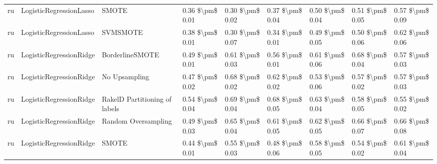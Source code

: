 \begin{tabular}{lllllllll}
      ru &         LogisticRegressionLasso &                         SMOTE &     0.36 \$\textbackslash pm\$ 0.01 &           0.30 \$\textbackslash pm\$ 0.02 &       0.37 \$\textbackslash pm\$ 0.04 &        0.50 \$\textbackslash pm\$ 0.04 &                         0.51 \$\textbackslash pm\$ 0.05 &     0.57 \$\textbackslash pm\$ 0.09 \\
      ru &         LogisticRegressionLasso &                      SVMSMOTE &     0.38 \$\textbackslash pm\$ 0.01 &           0.30 \$\textbackslash pm\$ 0.07 &       0.34 \$\textbackslash pm\$ 0.01 &        0.49 \$\textbackslash pm\$ 0.05 &                         0.50 \$\textbackslash pm\$ 0.06 &     0.62 \$\textbackslash pm\$ 0.06 \\
      ru &         LogisticRegressionRidge &               BorderlineSMOTE &     0.49 \$\textbackslash pm\$ 0.01 &           0.61 \$\textbackslash pm\$ 0.03 &       0.56 \$\textbackslash pm\$ 0.01 &        0.61 \$\textbackslash pm\$ 0.06 &                         0.68 \$\textbackslash pm\$ 0.04 &     0.57 \$\textbackslash pm\$ 0.03 \\
      ru &         LogisticRegressionRidge &                 No Upsampling &     0.47 \$\textbackslash pm\$ 0.02 &           0.68 \$\textbackslash pm\$ 0.02 &       0.62 \$\textbackslash pm\$ 0.02 &        0.53 \$\textbackslash pm\$ 0.06 &                         0.57 \$\textbackslash pm\$ 0.02 &     0.57 \$\textbackslash pm\$ 0.03 \\
      ru &         LogisticRegressionRidge & RakelD Partitioning of labels &     0.54 \$\textbackslash pm\$ 0.04 &           0.69 \$\textbackslash pm\$ 0.04 &       0.68 \$\textbackslash pm\$ 0.05 &        0.63 \$\textbackslash pm\$ 0.04 &                         0.58 \$\textbackslash pm\$ 0.05 &     0.55 \$\textbackslash pm\$ 0.02 \\
      ru &         LogisticRegressionRidge &           Random Oversampling &     0.49 \$\textbackslash pm\$ 0.03 &           0.65 \$\textbackslash pm\$ 0.04 &       0.61 \$\textbackslash pm\$ 0.05 &        0.62 \$\textbackslash pm\$ 0.05 &                         0.66 \$\textbackslash pm\$ 0.07 &     0.66 \$\textbackslash pm\$ 0.08 \\
      ru &         LogisticRegressionRidge &                         SMOTE &     0.44 \$\textbackslash pm\$ 0.01 &           0.55 \$\textbackslash pm\$ 0.03 &       0.48 \$\textbackslash pm\$ 0.06 &        0.58 \$\textbackslash pm\$ 0.05 &                         0.54 \$\textbackslash pm\$ 0.02 &     0.61 \$\textbackslash pm\$ 0.04 \\

\end{tabular}

